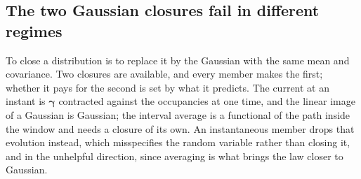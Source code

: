 \subsection*{The two Gaussian closures fail in different regimes}

To close a distribution is to replace it by the Gaussian with the same mean and covariance. Two
closures are available, and every member makes the first; whether it pays for the second is set by
what it predicts. The current at an instant is $\bm{\gamma}$ contracted against the occupancies at
one time, and the linear image of a Gaussian is Gaussian; the interval average is a functional of
the path inside the window and needs a closure of its own. An instantaneous member drops that
evolution instead, which misspecifies the random variable rather than closing it, and in the
unhelpful direction, since averaging is what brings the law closer to Gaussian.

